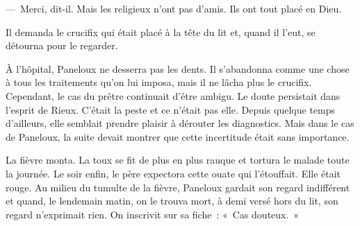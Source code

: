\documentclass[french,twoside]{book} %
\begin{document}
— Merci, dit-il. Mais les religieux n’ont pas d’amis. Ils ont tout placé en Dieu.\par
Il demanda le crucifix qui était placé à la tête du lit et, quand il l’eut, se détourna pour le regarder.\par
À l’hôpital, Paneloux ne desserra pas les dents. Il s’abandonna comme une chose à tous les traitements qu’on lui imposa, mais il ne lâcha plus le crucifix. Cependant, le cas du prêtre continuait d’être ambigu. Le doute persistait dans l’esprit de Rieux. C’était la peste et ce n’était pas elle. Depuis quelque temps d’ailleurs, elle semblait prendre plaisir à dérouter les diagnostics. Mais dans le cas de Paneloux, la suite devait montrer que cette incertitude était sans importance.\par
La fièvre monta. La toux se fit de plus en plus rauque et tortura le malade toute la journée. Le soir enfin, le père expectora cette ouate qui l’étouffait. Elle était rouge. Au milieu du tumulte de la fièvre, Paneloux gardait son regard indifférent et quand, le lendemain matin, on le trouva mort, à demi versé hors du lit, son regard n’exprimait rien. On inscrivit sur sa fiche : « Cas douteux. »
\end{document}
